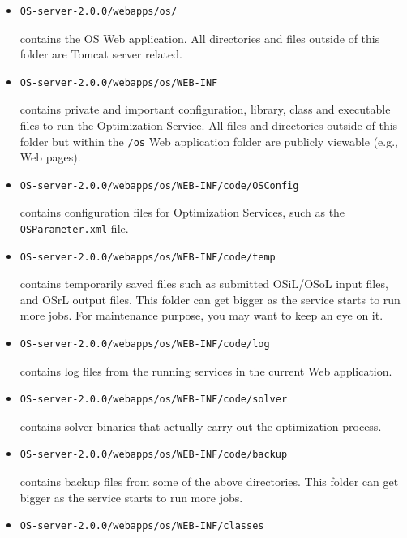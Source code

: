 \documentclass[11pt]{article}
\renewcommand{\_}{{\char"5F}}
\renewcommand{\{}{{\char"7B}}
\renewcommand{\}}{{\char"7D}}
\renewcommand{\^}{{\char"0D}}
\renewcommand{\'}{{\char"0D}}
\begin{document}
\begin{enumerate}[Step 1:]
\begin{itemize}
\item
\begin{verbatim}
OS-server-2.0.0/webapps/os/
\end{verbatim}
contains the OS Web application. All directories and files outside of this folder are Tomcat server related.
\item
\begin{verbatim}
OS-server-2.0.0/webapps/os/WEB-INF
\end{verbatim}
contains private and important configuration, library, class and executable files to run the Optimization Service.
All files and directories outside of this folder but within the {\tt /os} Web application folder are publicly viewable (e.g., Web pages).
\item
\begin{verbatim}
OS-server-2.0.0/webapps/os/WEB-INF/code/OSConfig
\end{verbatim}
contains configuration files for Optimization Services, such as the {\tt OSParameter.xml} file.
\item
\begin{verbatim}
OS-server-2.0.0/webapps/os/WEB-INF/code/temp
\end{verbatim}
contains temporarily saved files such as submitted OSiL/OSoL input files, and OSrL output files. This folder can get bigger as the service starts to run more jobs. For maintenance purpose, you may want to keep an eye on it.
\item
\begin{verbatim}
OS-server-2.0.0/webapps/os/WEB-INF/code/log
\end{verbatim}
contains log files from the running services in the current Web application.
\item
\begin{verbatim}
OS-server-2.0.0/webapps/os/WEB-INF/code/solver
\end{verbatim}
contains solver binaries that actually carry out the optimization process.
\item
\begin{verbatim}
OS-server-2.0.0/webapps/os/WEB-INF/code/backup
\end{verbatim}
contains backup files from some of the above directories. This folder can get bigger as the service starts to run more jobs.
\item
\begin{verbatim}
OS-server-2.0.0/webapps/os/WEB-INF/classes
\end{verbatim}

\end{itemize}
\end{enumerate}
\end{document}
